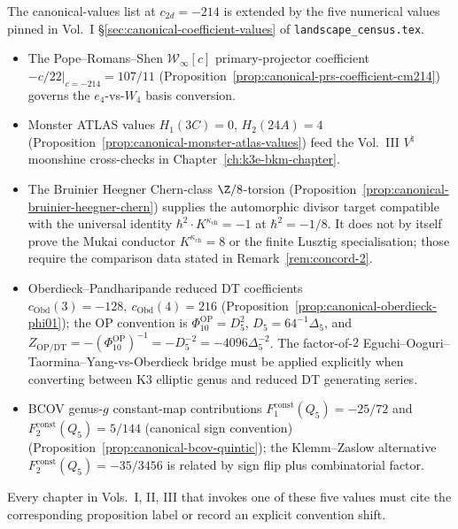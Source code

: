 \begin{remark}
\label{rem:concord-canonical-coefficient-cross-ref}
%
The canonical-values list at $c_{2d}=-214$ is
extended by the five numerical values pinned in Vol.~I
\S\ref{sec:canonical-coefficient-values} of
\texttt{landscape\_census.tex}.
\begin{itemize}
 \item The Pope--Romans--Shen
 $\mathcal W_\infty[c]$ primary-projector coefficient
 $-c/22|_{c=-214} = 107/11$
 \textup{(}Proposition~\ref{prop:canonical-prs-coefficient-cm214}\textup{)}
 governs the $e_4$-vs-$W_4$ basis conversion.
 \item Monster ATLAS values $H_1(3C)=0$, $H_2(24A)=4$
 \textup{(}Proposition~\ref{prop:canonical-monster-atlas-values}\textup{)}
 feed the Vol.~III $V^\natural$ moonshine cross-checks in
 Chapter~\ref{ch:k3e-bkm-chapter}.
 \item The Bruinier Heegner Chern-class $\Z/8$-torsion
 \textup{(}Proposition~\ref{prop:canonical-bruinier-heegner-chern}\textup{)}
 supplies the automorphic divisor target compatible with the
 universal identity
 $\hbar^2\cdot K^{\kappa_{\mathrm{ch}}} = -1$ at
 $\hbar^2 = -1/8$. It does not by itself prove the Mukai conductor
 $K^{\kappa_{\mathrm{ch}}}=8$ or the finite Lusztig
 specialisation; those require the comparison data stated in
 Remark~\ref{rem:concord-2}.
 \item Oberdieck--Pandharipande reduced DT coefficients
 $c_{\mathrm{Obd}}(3) = -128,\ c_{\mathrm{Obd}}(4) = 216$
 \textup{(}Proposition~\ref{prop:canonical-oberdieck-phi01}\textup{)};
 the OP convention is
 $\Phi_{10}^{\mathrm{OP}}=D_5^2$, $D_5=64^{-1}\Delta_5$, and
 $Z_{\mathrm{OP/DT}}=-(\Phi_{10}^{\mathrm{OP}})^{-1}
 =-D_5^{-2}=-4096\Delta_5^{-2}$. The factor-of-$2$
 Eguchi--Ooguri--Taormina--Yang-vs-Oberdieck bridge must be applied
 explicitly when converting between K3 elliptic genus and reduced
 DT generating series.
 \item BCOV genus-$g$ constant-map contributions
 $F_1^{\mathrm{const}}(Q_5) = -25/72$ and
$F_2^{\mathrm{const}}(Q_5) = 5/144$ \textup{(}canonical
sign convention\textup{)}
 \textup{(}Proposition~\ref{prop:canonical-bcov-quintic}\textup{)}; the
 Klemm--Zaslow alternative $F_2^{\mathrm{const}}(Q_5) = -35/3456$
 is related by sign flip plus combinatorial factor.
\end{itemize}
Every chapter in Vols.~I, II, III that invokes one of these five
values must cite the corresponding proposition label or record
an explicit convention shift.
\end{remark}


